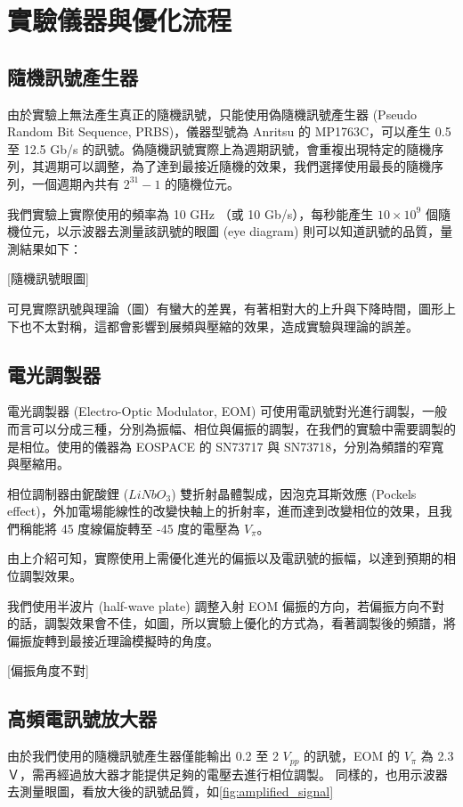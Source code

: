\documentclass[class=NCU_thesis, crop=false]{standalone}
\begin{document}
\chapter{實驗儀器與優化流程}

\section{隨機訊號產生器}
由於實驗上無法產生真正的隨機訊號，只能使用偽隨機訊號產生器 (Pseudo Random Bit Sequence, PRBS)，儀器型號為 Anritsu 的 MP1763C，可以產生 0.5 至 12.5 Gb/s 的訊號。偽隨機訊號實際上為週期訊號，會重複出現特定的隨機序列，其週期可以調整，為了達到最接近隨機的效果，我們選擇使用最長的隨機序列，一個週期內共有 $2^{31}-1$ 的隨機位元。

我們實驗上實際使用的頻率為 10 GHz （或 10 Gb/s），每秒能產生 $10\times 10^{9}$ 個隨機位元，以示波器去測量該訊號的眼圖 (eye diagram) 則可以知道訊號的品質，量測結果如下：

[隨機訊號眼圖]

可見實際訊號與理論（圖）有蠻大的差異，有著相對大的上升與下降時間，圖形上下也不太對稱，這都會影響到展頻與壓縮的效果，造成實驗與理論的誤差。

\section{電光調製器}
電光調製器 (Electro-Optic Modulator, EOM) 可使用電訊號對光進行調製，一般而言可以分成三種，分別為振幅、相位與偏振的調製，在我們的實驗中需要調製的是相位。使用的儀器為 EOSPACE 的 SN73717 與 SN73718，分別為頻譜的窄寬與壓縮用。

相位調制器由鈮酸鋰 ($LiNbO_{3}$) 雙折射晶體製成，因泡克耳斯效應 (Pockels effect)，外加電場能線性的改變快軸上的折射率，進而達到改變相位的效果，且我們稱能將 45 度線偏旋轉至 -45 度的電壓為 $V_{\pi}$。

由上介紹可知，實際使用上需優化進光的偏振以及電訊號的振幅，以達到預期的相位調製效果。

我們使用半波片 (half-wave plate) 調整入射 EOM 偏振的方向，若偏振方向不對的話，調製效果會不佳，如圖，所以實驗上優化的方式為，看著調製後的頻譜，將偏振旋轉到最接近理論模擬時的角度。

[偏振角度不對]

\section{高頻電訊號放大器}
由於我們使用的隨機訊號產生器僅能輸出 0.2 至 2 $V_{pp}$ 的訊號，EOM 的 $V_{\pi}$ 為 2.3 Ｖ，需再經過放大器才能提供足夠的電壓去進行相位調製。
同樣的，也用示波器去測量眼圖，看放大後的訊號品質，如\cref{fig:amplified_signal}
\end{document}

